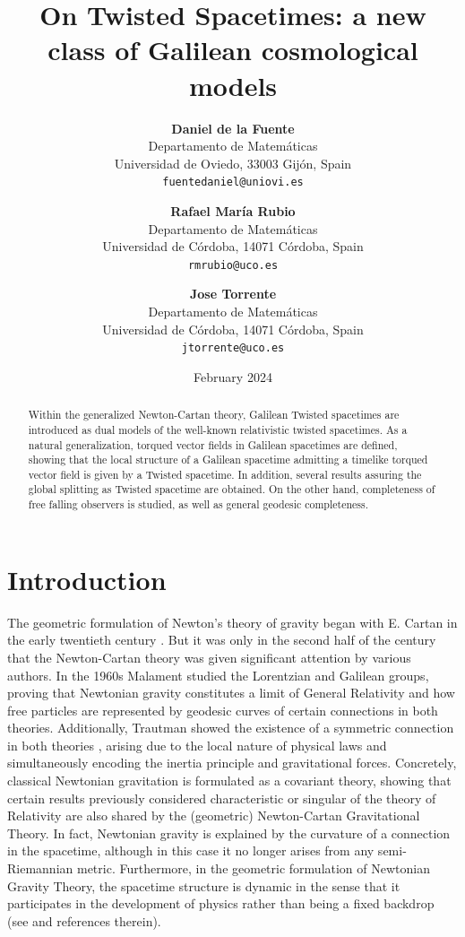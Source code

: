 \documentclass[12pt]{article}
\title{On Twisted Spacetimes: a new class of Galilean cosmological models}
\author{%
    \textbf{Daniel de la Fuente} \\
    Departamento de Matemáticas\\
    Universidad de Oviedo, 33003 Gijón, Spain \\
    \texttt{fuentedaniel@uniovi.es}
    \and
    \textbf{Rafael María Rubio} \\
    Departamento de Matemáticas\\
    Universidad de Córdoba, 14071 Córdoba, Spain \\
    \texttt{rmrubio@uco.es}
    \and
    \textbf{Jose Torrente} \\
    Departamento de Matemáticas\\
    Universidad de Córdoba, 14071 Córdoba, Spain \\
    \texttt{jtorrente@uco.es}
    }
\date{February 2024}
\begin{document}
\maketitle


\begin{abstract} Within the generalized Newton-Cartan theory, Galilean Twisted spacetimes are introduced as dual models of the well-known relativistic twisted spacetimes. As a natural generalization, torqued vector fields in Galilean spacetimes are defined, showing that the local structure of a Galilean spacetime admitting a timelike torqued vector field is given by a Twisted spacetime. In addition, several results assuring the global splitting as Twisted spacetime are obtained. On the other hand, completeness of free falling observers is studied, as well as general geodesic completeness.
    
\end{abstract}




\section{Introduction}
The geometric formulation of Newton's theory of gravity began with E. Cartan in the early twentieth century \cite{Cartan1, Cartan2}. But it was only in the second half of the century that the Newton-Cartan theory was given significant attention by various authors.
In the 1960s Malament studied the Lorentzian and Galilean groups, proving that Newtonian gravity constitutes a limit of General Relativity and how free particles are represented by geodesic curves of certain connections in both theories.
Additionally, Trautman showed the existence of a symmetric connection in both theories \cite{Trautman}, arising due to the local nature of physical laws and simultaneously encoding the inertia principle and gravitational forces. Concretely, classical Newtonian gravitation is formulated as a covariant theory, showing that certain results previously considered characteristic or singular of the theory of Relativity are also shared by the (geometric) Newton-Cartan Gravitational Theory. In fact, Newtonian gravity is explained by the curvature of a connection in the spacetime, although in this case it no longer arises from any semi-Riemannian metric. Furthermore, in the geometric formulation of Newtonian Gravity Theory, the spacetime structure is dynamic in the sense that it participates in the development of physics rather than being a fixed backdrop (see \cite{DB} and references therein).
\end{document}
